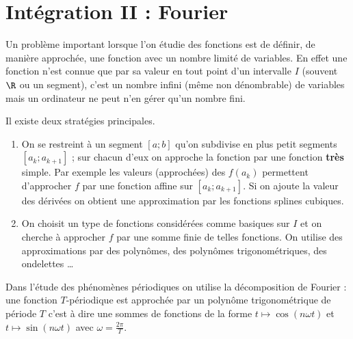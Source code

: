 \chapter{Intégration II : Fourier}
{\sf Un problème important lorsque l'on étudie des fonctions est de définir, de manière approchée, une fonction avec un nombre limité de variables. En effet une fonction n'est connue que par sa valeur en tout point d'un intervalle $I$ (souvent $\R$ ou un segment), c'est un nombre infini (même non dénombrable) de variables mais un ordinateur ne peut n'en gérer qu'un nombre fini.

Il existe deux stratégies principales.
\begin{enumerate}
    \item On se restreint à un segment $[a;b]$ qu'on subdivise en plus petit segments $[a_k;a_{k+1}]$ ; sur chacun d'eux on approche la fonction par une fonction {\bf très} simple. Par exemple les valeurs (approchées) des $f(a_k)$ permettent d'approcher $f$ par une fonction affine sur $[a_k;a_{k+1}]$. Si on ajoute la valeur des dérivées on obtient une approximation par les fonctions splines cubiques.
    \item On choisit un type de fonctions considérées comme basiques sur $I$ et on cherche à approcher $f$ par une somme finie de telles fonctions. On utilise des approximations par des polynômes, des polynômes trigonométriques, des ondelettes \dots
\end{enumerate}
\medskip
Dans l'étude des phénomènes périodiques on utilise la décomposition de Fourier : une fonction $T$-périodique est approchée par un polynôme trigonométrique de période $T$ c'est à dire une sommes de fonctions de la forme $t\mapsto \cos(n\omega t)$ et  $t\mapsto \sin(n\omega t)$ avec $\displaystyle \omega = \frac{2\pi}T$.}
